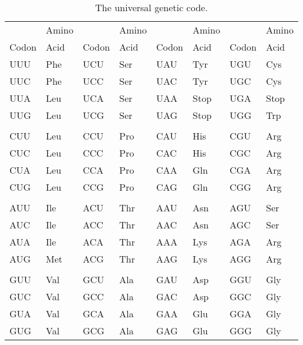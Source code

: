 \documentclass[12pt]{article}
\begin{document}
\begin{table}
\begin{center}
\begin{tabular}{llllllll}
\hline\hline
      & Amino &       & Amino &       & Amino &       & Amino \\
Codon & Acid  & Codon & Acid  & Codon & Acid  & Codon & Acid \\
\hline
UUU   & Phe   & UCU   & Ser   & UAU   & Tyr   & UGU   & Cys \\
UUC   & Phe   & UCC   & Ser   & UAC   & Tyr   & UGC   & Cys \\
UUA   & Leu   & UCA   & Ser   & UAA   & Stop  & UGA   & Stop \\
UUG   & Leu   & UCG   & Ser   & UAG   & Stop  & UGG   & Trp \\
      &       &       &       &       &       &       & \\
CUU   & Leu   & CCU   & Pro   & CAU   & His   & CGU   & Arg \\
CUC   & Leu   & CCC   & Pro   & CAC   & His   & CGC   & Arg \\
CUA   & Leu   & CCA   & Pro   & CAA   & Gln   & CGA   & Arg \\
CUG   & Leu   & CCG   & Pro   & CAG   & Gln   & CGG   & Arg \\
      &       &       &       &       &       &       & \\
AUU   & Ile   & ACU   & Thr   & AAU   & Asn   & AGU   & Ser \\
AUC   & Ile   & ACC   & Thr   & AAC   & Asn   & AGC   & Ser \\
AUA   & Ile   & ACA   & Thr   & AAA   & Lys   & AGA   & Arg \\
AUG   & Met   & ACG   & Thr   & AAG   & Lys   & AGG   & Arg \\
      &       &       &       &       &       &       & \\
GUU   & Val   & GCU   & Ala   & GAU   & Asp   & GGU   & Gly \\
GUC   & Val   & GCC   & Ala   & GAC   & Asp   & GGC   & Gly \\
GUA   & Val   & GCA   & Ala   & GAA   & Glu   & GGA   & Gly \\
GUG   & Val   & GCG   & Ala   & GAG   & Glu   & GGG   & Gly \\
\hline
\end{tabular}
\end{center}
\caption{The universal genetic code.}\label{table:code}
\end{table}
\end{document}
